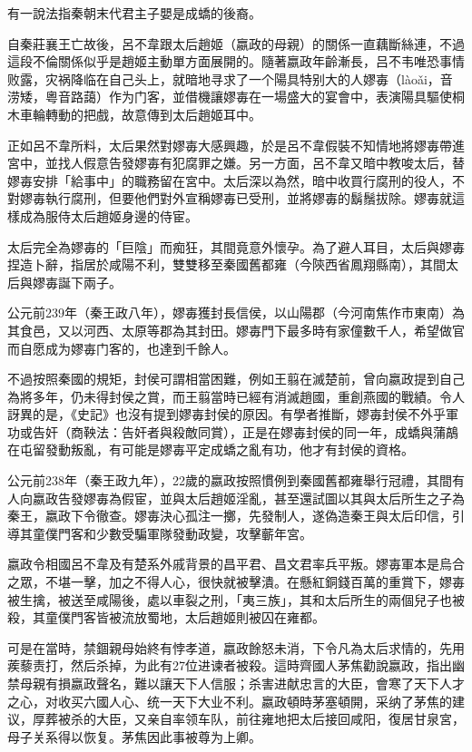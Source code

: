 有一說法指秦朝末代君主子嬰是成蟜的後裔。

自秦莊襄王亡故後，呂不韋跟太后趙姬（嬴政的母親）的關係一直藕斷絲連，不過這段不倫關係似乎是趙姬主動單方面展開的。隨著嬴政年齡漸長，吕不韦唯恐事情败露，灾祸降临在自己头上，就暗地寻求了一个陽具特别大的人嫪毐（làoǎi，音涝矮，粵音路藹）作为门客，並借機讓嫪毐在一場盛大的宴會中，表演陽具驅使桐木車輪轉動的把戲，故意傳到太后趙姬耳中。

正如呂不韋所料，太后果然對嫪毐大感興趣，於是呂不韋假裝不知情地將嫪毐帶進宮中，並找人假意告發嫪毐有犯腐罪之嫌。另一方面，呂不韋又暗中教唆太后，替嫪毐安排「給事中」的職務留在宮中。太后深以為然，暗中收買行腐刑的役人，不對嫪毐執行腐刑，但要他們對外宣稱嫪毐已受刑，並將嫪毐的鬍鬚拔除。嫪毐就這樣成為服侍太后趙姬身邊的侍宦。

太后完全為嫪毐的「巨陰」而痴狂，其間竟意外懷孕。為了避人耳目，太后與嫪毐捏造卜辭，指居於咸陽不利，雙雙移至秦國舊都雍（今陝西省鳳翔縣南），其間太后與嫪毐誕下兩子。

公元前239年（秦王政八年），嫪毐獲封長信侯，以山陽郡（今河南焦作市東南）為其食邑，又以河西、太原等郡為其封田。嫪毐門下最多時有家僮數千人，希望做官而自愿成为嫪毐门客的，也達到千餘人。

不過按照秦國的規矩，封侯可謂相當困難，例如王翦在滅楚前，曾向嬴政提到自己為將多年，仍未得封侯之賞，而王翦當時已經有消滅趙國，重創燕國的戰績。令人訝異的是，《史記》也沒有提到嫪毐封侯的原因。有學者推斷，嫪毐封侯不外乎軍功或告奸（商鞅法：告奸者與殺敵同賞），正是在嫪毐封侯的同一年，成蟜與蒲鶮在屯留發動叛亂，有可能是嫪毐平定成蟜之亂有功，他才有封侯的資格。

公元前238年（秦王政九年），22歲的嬴政按照慣例到秦國舊都雍舉行冠禮，其間有人向嬴政告發嫪毐為假宦，並與太后趙姬淫亂，甚至還試圖以其與太后所生之子為秦王，嬴政下令徹查。嫪毐決心孤注一擲，先發制人，遂偽造秦王與太后印信，引導其童僕門客和少數受騙軍隊發動政變，攻擊蘄年宮。

嬴政令相國呂不韋及有楚系外戚背景的昌平君、昌文君率兵平叛。嫪毐軍本是烏合之眾，不堪一擊，加之不得人心，很快就被擊潰。在懸紅銅錢百萬的重賞下，嫪毐被生擒，被送至咸陽後，處以車裂之刑，「夷三族」，其和太后所生的兩個兒子也被殺，其童僕門客皆被流放蜀地，太后趙姬則被囚在雍都。

可是在當時，禁錮親母始終有悖孝道，嬴政餘怒未消，下令凡為太后求情的，先用蒺藜责打，然后杀掉，为此有27位进谏者被殺。這時齊國人茅焦勸說嬴政，指出幽禁母親有損嬴政聲名，難以讓天下人信服；杀害进献忠言的大臣，會寒了天下人才之心，对收买六國人心、统一天下大业不利。嬴政頓時茅塞頓開，采纳了茅焦的建议，厚葬被杀的大臣，又亲自率领车队，前往雍地把太后接回咸阳，復居甘泉宮，母子关系得以恢复。茅焦因此事被尊为上卿。

